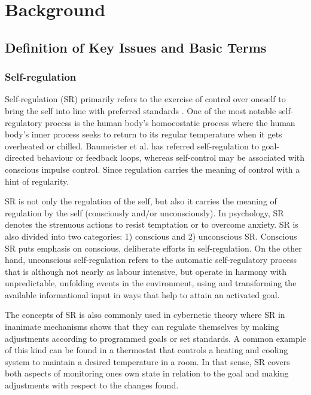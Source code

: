 \chapter{Background}
\label{bg}
\section{Definition of Key Issues and Basic Terms}
\subsection{Self-regulation}
Self-regulation (SR) primarily refers to the exercise of control over oneself to bring the self into line with preferred standards \cite{Baumeister+2007}. One of the most notable self-regulatory process is the human body's homoeostatic process where the human body's inner process seeks to return to its regular temperature when it gets overheated or chilled. Baumeister et al. has referred self-regulation to goal-directed behaviour or feedback loops, whereas self-control may be associated with conscious impulse control. Since regulation carries  the meaning of  control with a hint of regularity.  

SR is not only the regulation of the self, but also it carries the meaning of regulation by the self (consciously and/or unconsciously). In psychology, SR denotes the strenuous actions to resist temptation or to overcome anxiety.  SR is also divided into two categories: 1) conscious and 2) unconscious SR.  Conscious SR puts emphasis on conscious, deliberate efforts in self-regulation. On the other hand, unconscious self-regulation refers to the automatic self-regulatory process  that is although not nearly as labour intensive, but operate in harmony with unpredictable, unfolding events in the environment, using and transforming the available informational input in ways that help to attain an activated goal.

The concepts of SR is also commonly used in cybernetic theory where SR in inanimate mechanisms shows that they can regulate themselves by making adjustments according to programmed goals or set standards. A common example of this kind can be found in a thermostat that controls a heating  and cooling system to maintain a desired temperature in a room. In that sense, SR covers both aspects of monitoring ones own state in relation to the goal and making adjustments with respect to the changes found. 

